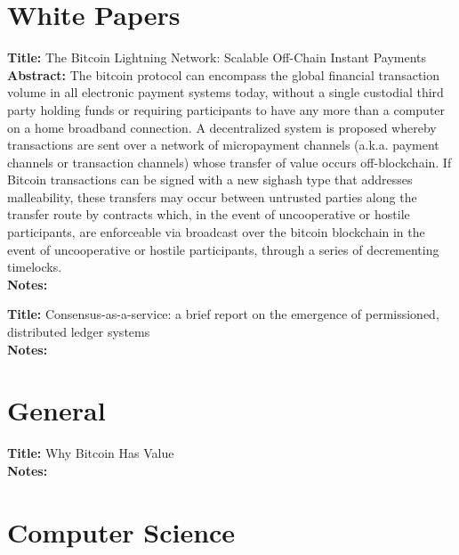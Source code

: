 \documentclass[a4paper, 12pt]{scrartcl}
\begin{document}
\section{White Papers}

\textbf{Title:} The Bitcoin Lightning Network: Scalable Off-Chain Instant Payments \parencite{poon2015bitcoin} \\
\textbf{Abstract:} The bitcoin protocol can encompass the global financial transaction
volume in all electronic payment systems today, without a single custodial
third party holding funds or requiring participants to have any
more than a computer on a home broadband connection. A decentralized
system is proposed whereby transactions are sent over a network of
micropayment channels (a.k.a. payment channels or transaction channels)
whose transfer of value occurs off-blockchain. If Bitcoin transactions
can be signed with a new sighash type that addresses malleability,
these transfers may occur between untrusted parties along the transfer
route by contracts which, in the event of uncooperative or hostile
participants, are enforceable via broadcast over the bitcoin blockchain
in the event of uncooperative or hostile participants, through a series
of decrementing timelocks.\\
\textbf{Notes:} 

\textbf{Title:} Consensus-as-a-service: a brief report on the emergence of permissioned, distributed ledger systems \parencite{swansonconsensus} \\
\textbf{Notes:} 

\section{General}

\textbf{Title:} Why Bitcoin Has Value \parencite{VanAlstyne:2014:WBV:2594413.2594288} \\
\textbf{Notes:} 

\section{Computer Science}
\end{document}
